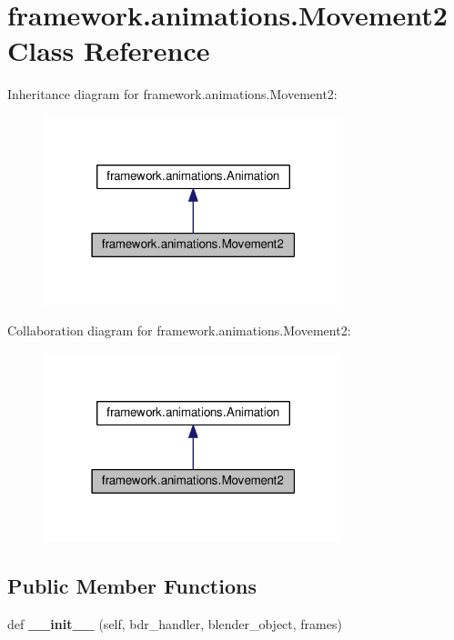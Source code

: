 \hypertarget{classframework_1_1animations_1_1Movement2}{}\section{framework.\+animations.\+Movement2 Class Reference}
\label{classframework_1_1animations_1_1Movement2}


Inheritance diagram for framework.\+animations.\+Movement2\+:
\nopagebreak
\begin{figure}[H]
\begin{center}
\leavevmode
\includegraphics[width=247pt]{classframework_1_1animations_1_1Movement2__inherit__graph}
\end{center}
\end{figure}


Collaboration diagram for framework.\+animations.\+Movement2\+:
\nopagebreak
\begin{figure}[H]
\begin{center}
\leavevmode
\includegraphics[width=247pt]{classframework_1_1animations_1_1Movement2__coll__graph}
\end{center}
\end{figure}
\subsection*{Public Member Functions}
\begin{DoxyCompactItemize}
\item 
def {\bfseries \+\_\+\+\_\+init\+\_\+\+\_\+} (self, bdr\+\_\+handler, blender\+\_\+object, frames)\hypertarget{classframework_1_1animations_1_1Movement2_aecd510c25bd0ee4ccb398b9fbe85826f}{}\label{classframework_1_1animations_1_1Movement2_aecd510c25bd0ee4ccb398b9fbe85826f}

\end{DoxyCompactItemize}
